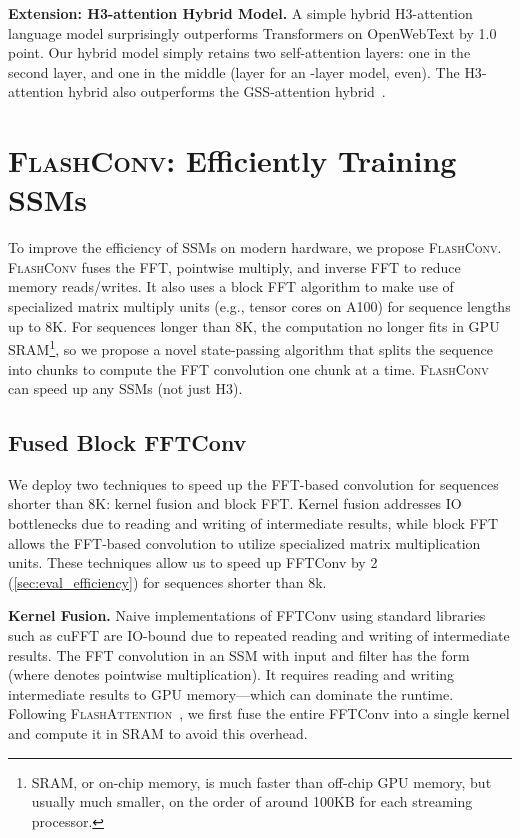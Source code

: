 \documentclass{article}
\newcommand{\fastfft}{\textsc{FlashConv}\xspace}
\newcommand{\hthree}{\textsc{H3}\xspace}
\begin{document}
\textbf{Extension: H3-attention Hybrid Model.}
A simple hybrid \hthree-attention language model surprisingly outperforms Transformers on OpenWebText by 1.0 point.
Our hybrid model simply retains two self-attention layers: one in the second layer, and one in the middle (layer  for an -layer model,  even).
The \hthree-attention hybrid also outperforms the GSS-attention hybrid~\citep{mehta2022long}.


\section{\fastfft: Efficiently Training SSMs\label{sec:efficiency}}

To improve the efficiency of SSMs on modern hardware, we propose \fastfft.
\fastfft fuses the FFT, pointwise multiply, and inverse FFT to reduce memory
reads/writes.
It also uses a block FFT algorithm to make use of specialized matrix multiply units (e.g., tensor cores on A100) for sequence lengths up to 8K.
For sequences longer than 8K, the computation no longer fits in GPU SRAM\footnote{SRAM, or on-chip memory, is much faster than off-chip GPU memory, but usually much smaller, on the order of around 100KB for each streaming processor.}, so we
propose a novel state-passing algorithm that splits the sequence into chunks to
compute the FFT convolution one chunk at a time.
\fastfft can speed up any SSMs (not just \hthree).


\subsection{Fused Block FFTConv}
\label{sec:systolic_fft}

We deploy two techniques to speed up the FFT-based convolution for sequences shorter than 8K: kernel fusion and block FFT.
Kernel fusion addresses IO bottlenecks due to reading and writing of intermediate results, while block FFT allows the FFT-based convolution to utilize specialized matrix multiplication units.
These techniques allow us to speed up FFTConv
by 2 (\cref{sec:eval_efficiency}) for sequences shorter than 8k.

\textbf{Kernel Fusion.}
Naive implementations of FFTConv using standard libraries such as cuFFT are IO-bound due to repeated reading and writing of intermediate results.
The FFT convolution in an SSM with input  and filter  has the form  (where  denotes pointwise multiplication).
It requires reading and writing intermediate results to GPU memory---which can dominate the runtime.
Following \textsc{FlashAttention}~\citep{dao2022flashattention}, we first fuse the entire FFTConv into a single kernel and compute it in SRAM to avoid this overhead.
\end{document}
